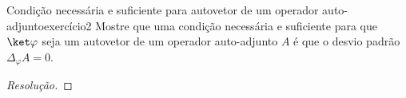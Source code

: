 \begin{exercício}{Condição necessária e suficiente para autovetor de um operador auto-adjunto}{exercício2}
    Mostre que uma condição necessária e suficiente para que \(\ket\varphi\) seja um autovetor de um operador auto-adjunto \(A\) é que o desvio padrão \(\Delta_\varphi A = 0\).
\end{exercício}
\begin{proof}[Resolução]

\end{proof}
